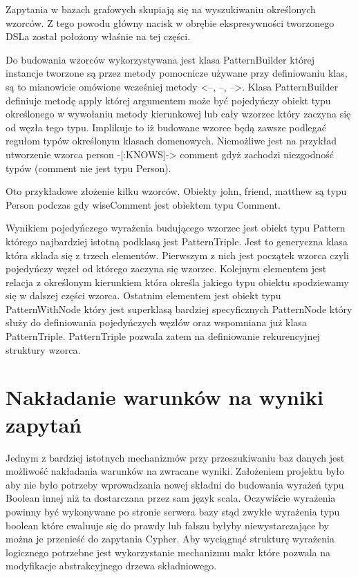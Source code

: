 \documentclass[brudnopis]{xmgr}
\begin{document}
Zapytania w bazach grafowych skupiają się na wyszukiwaniu określonych wzorców. Z tego powodu główny nacisk w obrębie ekspresywności tworzonego DSLa został położony właśnie na tej części.

Do budowania wzorców wykorzystywana jest klasa PatternBuilder której instancje tworzone są przez metody pomocnicze używane przy definiowaniu klas, są to mianowicie omówione wcześniej metody <--, --, -->. Klasa PatternBuilder definiuje metodę apply której argumentem może być pojedyńczy obiekt typu określonego w wywołaniu metody kierunkowej lub cały wzorzec który zaczyna się od węzła tego typu. Implikuje to iż budowane wzorce będą zawsze podlegać regułom typów określonym klasach domenowych. Niemożliwe jest na przykład utworzenie wzorca person -[:KNOWS]-> comment gdyż zachodzi niezgodność typów (comment nie jest typu Person).

Oto przykładowe złożenie kilku wzorców. Obiekty john, friend, matthew są typu Person podczas gdy wiseComment jest obiektem typu Comment.



Wynikiem pojedyńczego wyrażenia budującego wzorzec jest obiekt typu Pattern którego najbardziej istotną podklasą jest PatternTriple. Jest to generyczna klasa która składa się z trzech elementów. Pierwszym z nich jest początek wzorca czyli pojedyńczy węzeł od którego zaczyna się wzorzec. Kolejnym elementem jest relacja z określonym kierunkiem która określa jakiego typu obiektu spodziewamy się w dalszej części wzorca. Ostatnim elementem jest obiekt typu PatternWithNode który jest superklasą bardziej specyficznych PatternNode który służy do definiowania pojedyńczych węzłów oraz wspomniana już klasa PatternTriple. PatternTriple pozwala zatem na definiowanie rekurencyjnej struktury wzorca.

\section{Nakładanie warunków na wyniki zapytań}

Jednym z bardziej istotnych mechanizmów przy przeszukiwaniu baz danych jest możliwość nakładania warunków na zwracane wyniki. Założeniem projektu było aby nie było potrzeby wprowadzania nowej składni do budowania wyrażeń typu Boolean innej niż ta dostarczana przez sam język scala. Oczywiście wyrażenia powinny być wykonywane po stronie serwera bazy stąd zwykłe wyrażenia typu boolean które ewaluuje się do prawdy lub fałszu byłyby niewystarczające by można je przenieść do zapytania Cypher. Aby wyciągnąć strukturę wyrażenia logicznego potrzebne jest wykorzystanie mechanizmu makr które pozwala na modyfikacje abstrakcyjnego drzewa składniowego.
\end{document}
